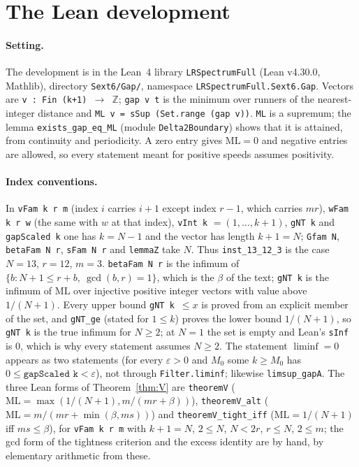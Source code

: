 \documentclass[11pt]{article}
\theoremstyle{definition}
\theoremstyle{remark}
\newcommand{\ML}{\mathrm{ML}}
\newcommand{\ZZ}{\mathbb{Z}}
\begin{document}
\section{The Lean development}\label{sec:lean}

\paragraph{Setting.}
The development is in the Lean~4 library \texttt{LRSpectrumFull} (Lean v4.30.0, Mathlib), directory \texttt{Sext6/Gap/}, namespace \texttt{LRSpectrumFull.Sext6.Gap}. Vectors are \texttt{v : Fin (k+1) $\to$ $\ZZ$}; \texttt{gap v t} is the minimum over runners of the nearest-integer distance and \texttt{ML v = sSup (Set.range (gap v))}. \texttt{ML} is a supremum; the lemma \texttt{exists\_gap\_eq\_ML} (module \texttt{Delta2Boundary}) shows that it is attained, from continuity and periodicity. A zero entry gives $\ML=0$ and negative entries are allowed, so every statement meant for positive speeds assumes positivity.

\paragraph{Index conventions.}
In \texttt{vFam k r m} (index $i$ carries $i+1$ except index $r-1$, which carries $mr$), \texttt{wFam k r w} (the same with $w$ at that index), \texttt{vInt k} $=(1,\dots,k+1)$, \texttt{gNT k} and \texttt{gapScaled k} one has $k=N-1$ and the vector has length $k+1=N$; \texttt{Gfam N}, \texttt{betaFam N r}, \texttt{sFam N r} and \texttt{lemmaZ} take $N$. Thus \texttt{inst\_13\_12\_3} is the case $N=13$, $r=12$, $m=3$. \texttt{betaFam N r} is the infimum of $\{b: N+1\le r+b,\ \gcd(b,r)=1\}$, which is the $\beta$ of the text; \texttt{gNT k} is the infimum of $\ML$ over injective positive integer vectors with value above $1/(N+1)$. Every upper bound \texttt{gNT k $\le x$} is proved from an explicit member of the set, and \texttt{gNT\_ge} (stated for $1\le k$) proves the lower bound $1/(N+1)$, so \texttt{gNT k} is the true infimum for $N\ge2$; at $N=1$ the set is empty and Lean's \texttt{sInf} is $0$, which is why every statement assumes $N\ge2$. The statement $\liminf=0$ appears as two statements (for every $\varepsilon>0$ and $M_0$ some $k\ge M_0$ has $0\le\texttt{gapScaled k}<\varepsilon$), not through \texttt{Filter.liminf}; likewise \texttt{limsup\_gapA}. The three Lean forms of Theorem~\ref{thm:V} are \texttt{theoremV} ($\ML=\max(1/(N+1),m/(mr+\beta))$), \texttt{theoremV\_alt} ($\ML=m/(mr+\min(\beta,ms))$) and \texttt{theoremV\_tight\_iff} ($\ML=1/(N+1)$ iff $ms\le\beta$), for \texttt{vFam k r m} with $k+1=N$, $2\le N$, $N<2r$, $r\le N$, $2\le m$; the gcd form of the tightness criterion and the excess identity are by hand, by elementary arithmetic from these.
\end{document}
